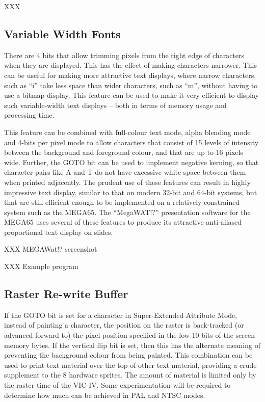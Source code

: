 XXX

\subsection{Variable Width Fonts}

There are 4 bits that allow trimming pixels from the right edge of characters when they are displayed. This has the effect of making
characters narrower. This can be useful for making more attractive text displays, where narrow characters, such as ``i'' take less space than wider characters, such as ``m'', without having to use a bitmap display. This feature can be used to make it very efficient to display
such variable-width text displays -- both in terms of memory usage and processing time.

This feature can be combined with full-colour text mode, alpha blending mode and 4-bits per pixel mode to allow characters that consist of
15 levels of intensity between the background and foreground colour, and that are up to 16 pixels wide.  Further, the GOTO bit can be used to implement negative kerning, so that character pairs like A and T do not have excessive white space between them when printed adjacently. The prudent use of these features can result in highly impressive text display, similar to that on modern 32-bit and 64-bit systems, but that are still efficient enough to be implemented on a relatively constrained system such as the MEGA65. The ``MegaWAT!?'' presentation software for the MEGA65 uses several of these features to produce its attractive anti-aliased proportional text display on slides.

XXX MEGAWat!? screenshot

XXX Example program

\subsection{Raster Re-write Buffer}

If the GOTO bit is set for a character in Super-Extended Attribute Mode, instead of painting a character, the position on the raster is back-tracked (or advanced forward to) the
pixel position specified in the low 10 bits of the screen memory bytes.  If the vertical flip bit is set, then this has the alternate
meaning of preventing the background colour from being painted.  This combination can be used to print text material over the top of
other text material, providing a crude supplement to the 8 hardware sprites.  The amount of material is limited only by the raster
time of the VIC-IV. Some experimentation will be required to determine how much can be achieved in PAL and NTSC modes.

